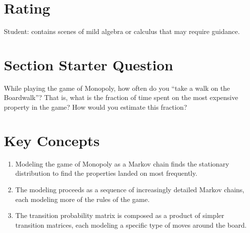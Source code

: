 \documentclass[12pt]{article}
\begin{document}
\myheader \mytitle

\hr


\hr

\usefirefox

\hr



\section*{Rating} %
Student:  contains scenes of mild algebra or calculus that may require
guidance.

\hr

\section*{Section Starter Question}

While playing the game of Monopoly, how often do you ``take a walk on
the Boardwalk''?  That is, what is the fraction of time spent on the
most expensive property in the game?  How would you estimate this
fraction?

\hr

\section*{Key Concepts}

\begin{enumerate}
    \item
        Modeling the game of Monopoly as a Markov chain finds the
        stationary distribution to find the properties landed on most
        frequently.
    \item
        The modeling proceeds as a sequence of increasingly detailed
        Markov chains, each modeling more of the rules of the game.
    \item
        The transition probability matrix is composed as a product of
        simpler transition matrices, each modeling a specific type of
        moves around the board.
\end{enumerate}
\end{document}
